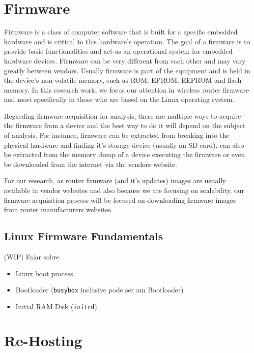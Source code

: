 \section{Firmware}

Firmware is a class of computer software that is built for a specific embedded hardware and is critical to this hardware's operation. The goal of a firmware is to provide basic functionalities and act as an operational system for embedded hardware devices. Firmware can be very different from each other and may vary greatly between vendors. Usually firmware is part of the equipment and is held in the device's non-volatile memory, such as ROM, EPROM, EEPROM and flash memory. In this research work, we focus our attention in wireless router firmware and most specifically in those who are based on the Linux operating system.

Regarding firmware acquisition for analysis, there are multiple ways to acquire the firmware from a device and the best way to do it will depend on the subject of analysis. For instance, firmware can be extracted from breaking into the physical hardware and finding it's storage device (usually an SD card), can also be extracted from the memory dump of a device executing the firmware or even be downloaded from the internet via the vendors website.

For our research, as router firmware (and it's updates) images are usually available in vendor websites and also because we are focusing on scalability, our firmware acquisition process will be focused on downloading firmware images from router manufacturers websites.

\subsection{Linux Firmware Fundamentals}

(WIP) Falar sobre
\begin{itemize}
    \item Linux boot process
    \item Bootloader ({\tt busybox} inclusive pode ser um Bootloader)
    \item Initial RAM Disk ({\tt initrd})
\end{itemize}

\section{Re-Hosting}
\label{sec:rehosting}

